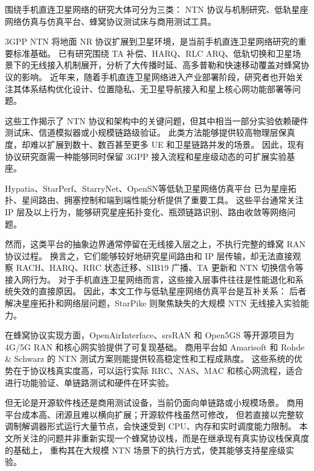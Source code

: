 
围绕手机直连卫星网络的研究大体可分为三类：
NTN 协议与机制研究、低轨星座网络仿真与仿真平台、蜂窝协议测试床与商用测试工具。


3GPP NTN 将地面 NR 协议扩展到卫星环境，是当前手机直连卫星网络研究的重要标准基础\cite{3gppNtn}。
已有研究围绕 TA 补偿、HARQ、RLC ARQ、低轨切换和卫星场景下的无线接入机制展开，分析了大传播时延、高多普勒和快速移动覆盖对蜂窝协议的影响\cite{ntnTaCompensation,ntnHarqRlc,leoHandoverSolutions}。
近年来，随着手机直连卫星网络进入产业部署阶段，研究者也开始关注其体系结构优化设计、位置隐私、无卫星导航接入和星上核心网功能部署等问题\cite{democratizingDtc,dtcLocationLeakage,dtcWithoutGnss,spaceCore}。

这些工作揭示了 NTN 协议和架构中的关键问题，但其中相当一部分实验依赖硬件测试床、信道模拟器或小规模链路级验证。
此类方法能够提供较高物理层保真度，却难以扩展到数十、数百甚至更多 UE 和卫星链路并发的场景。
因此，现有协议研究亟需一种能够同时保留 3GPP 接入流程和星座级动态的可扩展实验基座。


Hypatia、StarPerf、StarryNet、OpenSN等低轨卫星网络仿真平台\cite{hypatia,starperf,starrynet,opensn}
已为星座拓扑、星间路由、拥塞控制和端到端性能分析提供了重要工具。
这些平台通常关注 IP 层及以上行为，能够研究星座拓扑变化、瓶颈链路识别、路由收敛等网络问题\cite{misleadingLeoCc,leocc,leoBottleneck}。

然而，这类平台的抽象边界通常停留在无线接入层之上，不执行完整的蜂窝 RAN 协议过程。
换言之，它们能够较好地研究星间路由和 IP 层传输，却无法直接观察 RACH、HARQ、RRC 状态迁移、SIB19 广播、TA 更新和 NTN 切换信令等接入网行为。
对于手机直连卫星网络而言，这些接入层事件往往是性能退化和系统失效的直接原因。
因此，本文工作与低轨星座网络仿真平台是互补关系：
后者解决星座拓扑和网络层问题，StarPike 则聚焦缺失的大规模 NTN 无线接入实验能力。


在蜂窝协议实现方面，OpenAirInterface、srsRAN 和 Open5GS 等开源项目为 4G/5G RAN 和核心网实验提供了可复现基础\cite{oai,srsran,open5gs}。
商用平台如 Amarisoft 和 Rohde \& Schwarz 的 NTN 测试方案则能提供较高稳定性和工程成熟度\cite{amarisoft,rohdeNtn}。
这些系统的优势在于协议栈真实度高，可以运行实际 RRC、NAS、MAC 和核心网流程，适合进行功能验证、单链路测试和硬件在环实验。

但无论是开源软件栈还是商用测试设备，当前仍面向单链路或小规模场景。
商用平台成本高、闭源且难以横向扩展；开源软件栈虽然可修改，
但若直接以完整软调制解调器形式运行大量节点，会快速受到 CPU、内存和实时调度能力限制。
本文所关注的问题并非重新实现一个蜂窝协议栈，而是在继承现有真实协议栈保真度的基础上，
重构其在大规模 NTN 场景下的执行方式，使其能够支持星座级实验。

